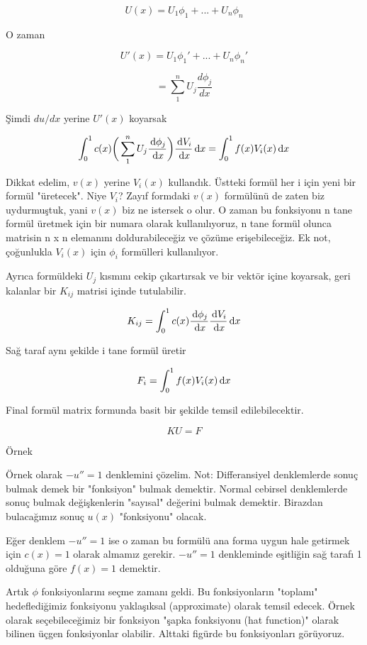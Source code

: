 \documentclass[12pt,fleqn]{article}\usepackage{../../common}
\begin{document}
$$ U(x) = U_1 \phi_1+ ... + U_n\phi_n $$

O zaman

$$ U'(x) = U_1 \phi_1'+ ... + U_n\phi_n' $$

$$ = \sum_1^n U_j \frac{d\phi_j}{dx} $$

Şimdi $du / dx$ yerine $U'(x)$ koyarsak

$$
\int_0^1 c(x) \bigg( \sum_1^n U_j \frac{\,\mathrm{d}\phi_j}{\,\mathrm{d} x}\bigg)
\frac{\,\mathrm{d} V_i}{\,\mathrm{d} x}\,\mathrm{d} x
= \int_0^1 f(x)V_i(x)\,\mathrm{d} x
$$

Dikkat edelim, $v(x)$ yerine $V_i(x)$ kullandık. Üstteki formül her i için yeni
bir formül "üretecek". Niye $V_i$? Zayıf formdaki $v(x)$ formülünü de zaten
biz uydurmuştuk, yani $v(x)$ biz ne istersek o olur. O zaman bu fonksiyonu n
tane formül üretmek için bir numara olarak kullanılıyoruz, n tane formül olunca
matrisin n x n elemanını doldurabileceğiz ve çözüme erişebileceğiz. Ek not,
çoğunlukla $V_i(x)$ için $\phi_i$ formülleri kullanılıyor. 

Ayrıca formüldeki $U_j$ kısmını cekip çıkartırsak ve bir vektör içine koyarsak,
geri kalanlar bir $K_{ij}$ matrisi içinde tutulabilir. 

$$ K_{ij} = \int_0^1 c(x) \frac{\,\mathrm{d}\phi_j}{\,\mathrm{d} x} \frac{\,\mathrm{d} V_i}{\,\mathrm{d} x} \,\mathrm{d} x  $$

Sağ taraf aynı şekilde i tane formül üretir

$$ F_i = \int_0^1 f(x)V_i(x) \,\mathrm{d} x $$

Final formül matrix formunda basit bir şekilde temsil edilebilecektir. 

$$ KU = F $$

Örnek

Örnek olarak $-u'' = 1$ denklemini çözelim. Not: Differansiyel
denklemlerde sonuç bulmak demek bir "fonksiyon" bulmak
demektir. Normal cebirsel denklemlerde sonuç bulmak değişkenlerin
"sayısal" değerini bulmak demektir. Birazdan bulacağımız sonuç
$u(x)$ "fonksiyonu" olacak.

Eğer denklem $-u''=1$ ise o zaman bu formülü ana forma uygun hale
getirmek için $c(x) = 1$ olarak almamız gerekir. $-u''=1$ denkleminde
eşitliğin sağ tarafı 1 olduğuna göre $f(x) = 1$ demektir.

Artık $\phi$ fonksiyonlarını seçme zamanı geldi. Bu fonksiyonların
"toplamı" hedeflediğimiz fonksiyonu yaklaşıksal (approximate) olarak
temsil edecek. Örnek olarak seçebileceğimiz bir fonksiyon "şapka
fonksiyonu (hat function)" olarak bilinen üçgen fonksiyonlar
olabilir. Alttaki figürde bu fonksiyonları görüyoruz.
\end{document}

